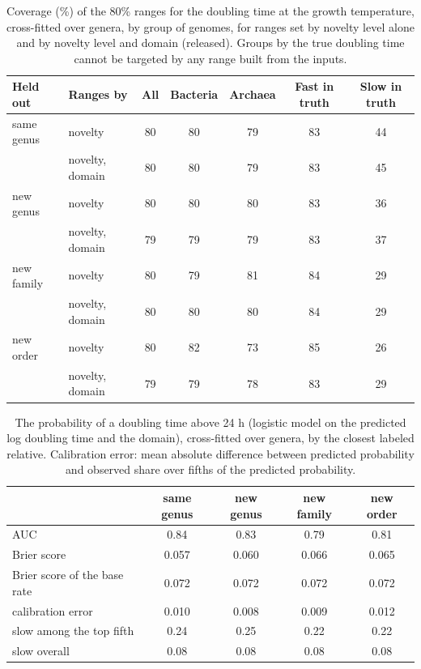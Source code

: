 \begin{table}[ht]\centering\small
\caption{Coverage (\%) of the 80\% ranges for the doubling time at the growth temperature, cross-fitted over genera, by group of genomes, for ranges set by novelty level alone and by novelty level and domain (released). Groups by the true doubling time cannot be targeted by any range built from the inputs.}\label{tab:ranges}
\begin{tabular}{llccccc}
\toprule
Held out & Ranges by & All & Bacteria & Archaea & Fast in truth & Slow in truth \\
\midrule
same genus & novelty & 80 & 80 & 79 & 83 & 44 \\
 & novelty, domain & 80 & 80 & 79 & 83 & 45 \\
new genus & novelty & 80 & 80 & 80 & 83 & 36 \\
 & novelty, domain & 79 & 79 & 79 & 83 & 37 \\
new family & novelty & 80 & 79 & 81 & 84 & 29 \\
 & novelty, domain & 80 & 80 & 80 & 84 & 29 \\
new order & novelty & 80 & 82 & 73 & 85 & 26 \\
 & novelty, domain & 79 & 79 & 78 & 83 & 29 \\
\bottomrule
\end{tabular}
\end{table}

\begin{table}[ht]\centering\small
\caption{The probability of a doubling time above 24 h (logistic model on the predicted log doubling time and the domain), cross-fitted over genera, by the closest labeled relative. Calibration error: mean absolute difference between predicted probability and observed share over fifths of the predicted probability.}\label{tab:slowprob}
\begin{tabular}{lcccc}
\toprule
& same genus & new genus & new family & new order \\
\midrule
AUC & 0.84 & 0.83 & 0.79 & 0.81 \\
Brier score & 0.057 & 0.060 & 0.066 & 0.065 \\
Brier score of the base rate & 0.072 & 0.072 & 0.072 & 0.072 \\
calibration error & 0.010 & 0.008 & 0.009 & 0.012 \\
slow among the top fifth & 0.24 & 0.25 & 0.22 & 0.22 \\
slow overall & 0.08 & 0.08 & 0.08 & 0.08 \\
\bottomrule
\end{tabular}
\end{table}
